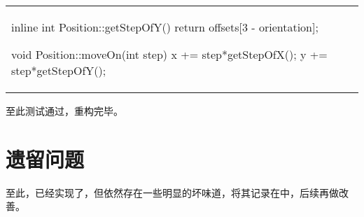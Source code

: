 \begin{content}
\begin{tabular}{@{}p{} 
                 | p{}@{}}
\begin{c++}[caption={src/robot-cleaner/Position.cpp}]
inline int Position::getStepOfY()
{ 
    return offsets[3 - orientation]; 
}

void Position::moveOn(int step)
{
    x += step*getStepOfX();
    y += step*getStepOfY();
}
\end{c++}
\end{tabular}

至此测试通过，重构完毕。

\end{content}

\section{遗留问题}

\begin{content}

至此，已经实现了，但依然存在一些明显的坏味道，将其记录在中，后续再做改善。

\begin{enum}
\end{enum}

\end{content}

